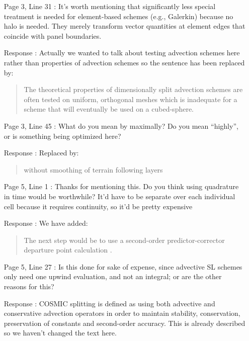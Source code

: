 \documentclass[12pt]{article}
\begin{document}
\begin{enumerate}
\item [Page 3, Line 31]: It's worth mentioning that significantly less special treatment is needed for element-based schemes (e.g., Galerkin) because no halo is needed. They merely transform vector quantities at element edges that coincide with panel boundaries.

\item [Response]: Actually we wanted to talk about testing advection schemes here rather than properties of advection schemes so the sentence has been replaced by:
\begin{quote}
The theoretical properties of dimensionally split advection schemes are often tested on uniform, orthogonal meshes \cite[eg][]{LLM96} which is inadequate for a scheme that will eventually be used on a cubed-sphere.
\end{quote}

\item [Page 3, Line 45]: What do you mean by maximally? Do you mean ``highly'', or is something being optimized here?

\item [Response]: Replaced by:
\begin{quote}
without smoothing of terrain following layers
\end{quote}

\item [Page 5, Line 1]: Thanks for mentioning this. Do you think using quadrature in time would be worthwhile? It'd have to be separate over each individual cell because it requires continuity, so it'd be pretty expensive

\item [Response]: We have added:
\begin{quote}
The next step would be to use a second-order predictor-corrector departure point calculation \cite[eg][]{MDW+10}.
\end{quote}

\item [Page 5, Line 27]: Is this done for sake of expense, since advective SL schemes only need one upwind evaluation, and not an integral; or are the other reasons for this?

\item [Response]: COSMIC splitting is defined as using both advective and conservative advection operators in order to maintain stability, conservation, preservation of constants and second-order accuracy. This is already described so we haven't changed the text here.


\end{enumerate}
\end{document}
